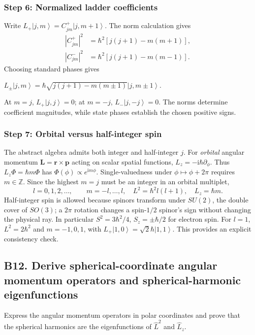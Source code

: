\documentclass[11pt,a4paper]{article}
\newcommand{\key}[1]{\begin{resultbox}\centering\(\displaystyle #1\)\end{resultbox}}
\newcommand{\iu}{\mathrm{i}}
\newcommand{\ket}[1]{\left|#1\right\rangle}
\begin{document}
\subsubsection*{Step 6: Normalized ladder coefficients}
Write \(L_+\ket{j,m}=C_{jm}^+\ket{j,m+1}\). The norm calculation gives
\begin{align}
|C_{jm}^+|^2&=\hbar^2[j(j+1)-m(m+1)],\\
|C_{jm}^-|^2&=\hbar^2[j(j+1)-m(m-1)].
\end{align}
Choosing standard phases gives
\key{\boxed{L_\pm\ket{j,m}=\hbar\sqrt{j(j+1)-m(m\pm1)}\ket{j,m\pm1}.}}
At \(m=j\), \(L_+\ket{j,j}=0\); at \(m=-j\), \(L_-\ket{j,-j}=0\). The norms determine coefficient magnitudes, while state phases establish the chosen positive signs.

\subsubsection*{Step 7: Orbital versus half-integer spin}
The abstract algebra admits both integer and half-integer \(j\). For \emph{orbital} angular momentum \(\mathbf L=\mathbf r\times\mathbf p\) acting on scalar spatial functions, \(L_z=-\iu\hbar\partial_\phi\). Thus \(L_z\Phi=\hbar m\Phi\) has \(\Phi(\phi)\propto e^{\iu m\phi}\). Single-valuedness under \(\phi\mapsto\phi+2\pi\) requires \(m\in\mathbb Z\). Since the highest \(m=j\) must be an integer in an orbital multiplet,
\begin{equation}\boxed{l=0,1,2,\ldots,\qquad m=-l,\ldots,l,\quad L^2=\hbar^2l(l+1),\quad L_z=\hbar m.}\end{equation}
Half-integer spin is allowed because spinors transform under \(SU(2)\), the double cover of \(SO(3)\); a \(2\pi\) rotation changes a spin-\(1/2\) spinor's sign without changing the physical ray. In particular \(S^2=3\hbar^2/4\), \(S_z=\pm\hbar/2\) for electron spin. For \(l=1\), \(L^2=2\hbar^2\) and \(m=-1,0,1\), with \(L_+\ket{1,0}=\sqrt2\hbar\ket{1,1}\). This provides an explicit consistency check.

\subsection{B12. Derive spherical-coordinate angular momentum operators and spherical-harmonic eigenfunctions}
\begin{questionbox}Express the angular momentum operators in polar coordinates and prove that the spherical harmonics are the eigenfunctions of \(\hat L^2\) and \(\hat L_z\).\end{questionbox}
\end{document}
